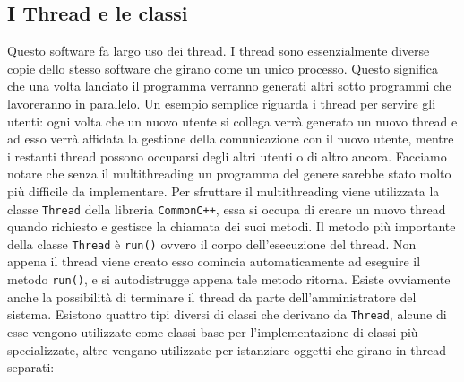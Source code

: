 \subsection{I Thread e le classi}
Questo software fa largo uso dei thread. I thread sono essenzialmente
diverse copie dello stesso software che girano come un unico
processo. Questo significa che una volta lanciato il programma
verranno generati altri sotto programmi che lavoreranno in
parallelo. Un esempio semplice riguarda i thread per servire gli
utenti: ogni volta che un nuovo utente si collega verr\`a generato un
nuovo thread e ad esso verr\`a affidata la gestione della
comunicazione con il nuovo utente, mentre i restanti thread possono
occuparsi degli altri utenti o di altro ancora. Facciamo notare che
senza il multithreading un programma del genere sarebbe stato molto
pi\`u difficile da implementare.
%
Per sfruttare il multithreading viene utilizzata la classe
\verb|Thread| della libreria \verb|CommonC++|, essa si occupa di
creare un nuovo thread quando richiesto e gestisce la chiamata dei
suoi metodi. Il metodo pi\`u importante della classe \verb|Thread| \`e
\verb|run()| ovvero il corpo dell'esecuzione del thread. Non appena il
thread viene creato esso comincia automaticamente ad eseguire il
metodo \verb|run()|, e si autodistrugge appena tale metodo
ritorna. Esiste ovviamente anche la possibilit\`a di terminare il
thread da parte dell'amministratore del sistema.
%
Esistono quattro tipi diversi di classi che derivano da \verb|Thread|,
alcune di esse vengono utilizzate come classi base per
l'implementazione di classi pi\`u specializzate, altre vengano
utilizzate per istanziare oggetti che girano in thread separati:
